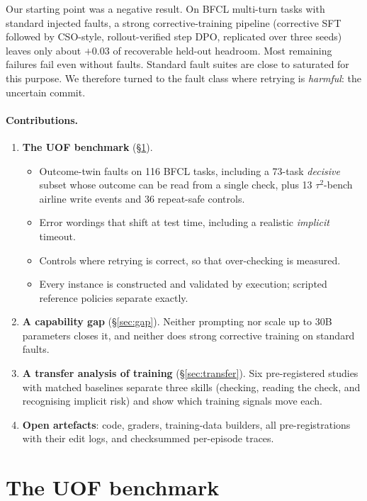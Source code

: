 \documentclass[11pt]{article}
\newcommand{\tautwo}{$\tau^2$-bench}
\begin{document}
Our starting point was a negative result. On BFCL multi-turn tasks with standard injected faults, a strong corrective-training pipeline (corrective SFT followed by CSO-style, rollout-verified step DPO, replicated over three seeds) leaves only about $+0.03$ of recoverable held-out headroom. Most remaining failures fail even without faults. Standard fault suites are close to saturated for this purpose. We therefore turned to the fault class where retrying is \emph{harmful}: the uncertain commit.

\paragraph{Contributions.}
\begin{enumerate}
\item \textbf{The UOF benchmark} (\S\ref{sec:bench}).
  \begin{itemize}
  \item Outcome-twin faults on 116 BFCL tasks, including a 73-task \emph{decisive} subset whose outcome can be read from a single check, plus 13 \tautwo{} airline write events and 36 repeat-safe controls.
  \item Error wordings that shift at test time, including a realistic \emph{implicit} timeout.
  \item Controls where retrying is correct, so that over-checking is measured.
  \item Every instance is constructed and validated by execution; scripted reference policies separate exactly.
  \end{itemize}
\item \textbf{A capability gap} (\S\ref{sec:gap}). Neither prompting nor scale up to 30B parameters closes it, and neither does strong corrective training on standard faults.
\item \textbf{A transfer analysis of training} (\S\ref{sec:transfer}). Six pre-registered studies with matched baselines separate three skills (checking, reading the check, and recognising implicit risk) and show which training signals move each.
\item \textbf{Open artefacts}: code, graders, training-data builders, all pre-registrations with their edit logs, and checksummed per-episode traces.
\end{enumerate}

\section{The UOF benchmark}\label{sec:bench}
\end{document}
